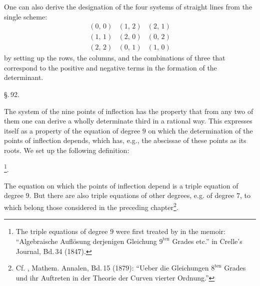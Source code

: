 
One can also derive the designation of the four systems of straight
lines from the single scheme:
\[
\begin{array}{ccc}
(0,\,0) & (1,\,2) & (2,\,1)\\
(1,\,1) & (2,\,0) & (0,\,2)\\
(2,\,2) & (0,\,1) & (1,\,0)
\end{array}
\]
by setting up the rows, the columns, and the combinations of three
that correspond to the positive and negative terms in the formation
of the determinant.

\S.\,92.


The system of the nine points of inflection has the property
that from any two of them one can derive a wholly determinate
third in a rational way. This expresses itself as a property of the
equation of degree $9$ on which the determination of the points of
inflection depends, which has, e.g., the abscissae of these points
as its roots. We set up the following definition:

\footnote{The triple equations of degree $9$ were first treated by
 in the memoir: ``Algebraische Auflösung derjenigen Gleichung
$9^{\text{ten}}$ Grades etc.'' in Crelle's Journal, Bd.\,34 (1847).}.

The equation on which the points of inflection depend is a
triple equation of degree $9$. But there are also triple equations
of other degrees, e.g. of degree $7$, to which belong those considered
in the preceding chapter\footnote{Cf. , Mathem. Annalen, Bd.\,15 (1879): ``Ueber die Gleichungen
$8^{\text{ten}}$ Grades und ihr Auftreten in der Theorie der Curven vierter
Ordnung.''}.

